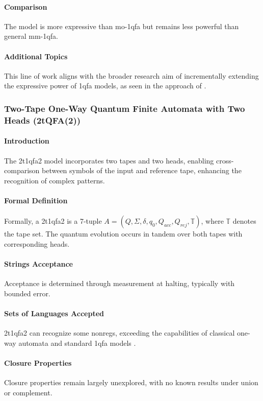 \paragraph{Comparison}
The model is more expressive than \gls{mo-1qfa} but remains less powerful than general \gls{mm-1qfa}.

\paragraph{Additional Topics}
This line of work aligns with the broader research aim of incrementally extending the expressive power of \gls{1qfa} models, as seen in the approach of \cite{ciamarra2001quantum}.

\subsubsection{Two-Tape One-Way Quantum Finite Automata with Two Heads (2tQFA(2))}
\paragraph{Introduction}
The \gls{2t1qfa2} model incorporates two tapes and two heads, enabling cross-comparison between symbols of the input and reference tape, enhancing the recognition of complex patterns.

\paragraph{Formal Definition}
Formally, a \gls{2t1qfa2} is a 7-tuple \( A = (Q, \Sigma, \delta, q_0, Q_{acc}, Q_{rej}, \mathbb{T}) \), where \( \mathbb{T} \) denotes the tape set. The quantum evolution occurs in tandem over both tapes with corresponding heads.

\paragraph{Strings Acceptance}
Acceptance is determined through measurement at halting, typically with bounded error.

\paragraph{Sets of Languages Accepted}
\gls{2t1qfa2} can recognize some non\glspl{reg}, exceeding the capabilities of classical one-way automata and standard \gls{1qfa} models \cite{ganguly20162}.

\paragraph{Closure Properties}
Closure properties remain largely unexplored, with no known results under union or complement.

